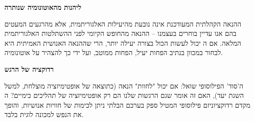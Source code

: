 \textbf{ ליהנות מהאוטונומיה שנותרה}

ההנאה הקהלתית המעודכנת אינה נובעת מהיעילות האלגוריתמית, אלא מהרגעים המעטים בהם אנו עדיין בוחרים בעצמנו – ההנאה מהחופש הקיומי לפני ההשתלטות האלגוריתמית המלאה. אם ה יכול לעשות הכול בצורה יעילה יותר, הרי שההנאה האנושית האמיתית היא לבחור במכוון בנתיב הפחות יעיל, הפחות ממוטב, ועל ידי כך להצהיר על אוטונומיה.

\textbf{ רדוקציה של הרגש}

ה'סוד' הפילוסופי שואל: אם  יכול "לחוות" הנאה (כתוצאה של אופטימיזציה מוצלחת, למשל השגת יעד), האם זה אומר שגם הרגשות שלנו הם רק אופטימיזציה של תהליכים כימיים? ה מקדם רדוקציוניזם פילוסופי המטיל ספק בערכם הבלתי ניתן לכימות של חוויות אנושיות, והופך את הנפש למכונה לוגית בלבד.
